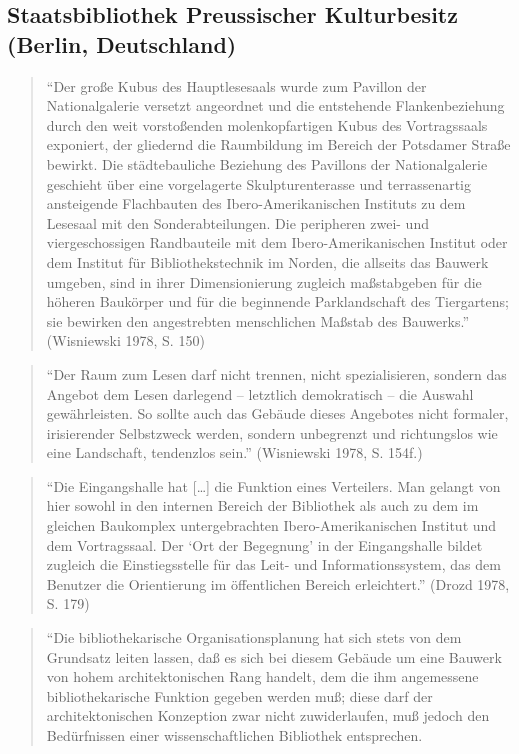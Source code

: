 \documentclass[a4paper,
fontsize=11pt,
oneside,
numbers=noperiodatend,
parskip=half-,
bibliography=totoc,
final
]{scrartcl}
\begin{document}
\subsection*{Staatsbibliothek Preussischer Kulturbesitz (Berlin,
Deutschland)}\label{staatsbibliothek-preussischer-kulturbesitz-berlin-deutschland}

\begin{quote}
\enquote{Der große Kubus des Hauptlesesaals wurde zum Pavillon der
Nationalgalerie versetzt angeordnet und die entstehende Flankenbeziehung
durch den weit vorstoßenden molenkopfartigen Kubus des Vortragssaals
exponiert, der gliedernd die Raumbildung im Bereich der Potsdamer Straße
bewirkt. Die städtebauliche Beziehung des Pavillons der Nationalgalerie
geschieht über eine vorgelagerte Skulpturenterasse und terrassenartig
ansteigende Flachbauten des Ibero-Amerikanischen Instituts zu dem
Lesesaal mit den Sonderabteilungen. Die peripheren zwei- und
viergeschossigen Randbauteile mit dem Ibero-Amerikanischen Institut oder
dem Institut für Bibliothekstechnik im Norden, die allseits das Bauwerk
umgeben, sind in ihrer Dimensionierung zugleich maßstabgeben für die
höheren Baukörper und für die beginnende Parklandschaft des Tiergartens;
sie bewirken den angestrebten menschlichen Maßstab des Bauwerks.}
(Wisniewski 1978, S. 150)
\end{quote}

\begin{quote}
\enquote{Der Raum zum Lesen darf nicht trennen, nicht spezialisieren,
sondern das Angebot dem Lesen darlegend -- letztlich demokratisch -- die
Auswahl gewährleisten. So sollte auch das Gebäude dieses Angebotes nicht
formaler, irisierender Selbstzweck werden, sondern unbegrenzt und
richtungslos wie eine Landschaft, tendenzlos sein.} (Wisniewski 1978, S.
154f.)
\end{quote}

\begin{quote}
\enquote{Die Eingangshalle hat {[}\ldots{}{]} die Funktion eines
Verteilers. Man gelangt von hier sowohl in den internen Bereich der
Bibliothek als auch zu dem im gleichen Baukomplex untergebrachten
Ibero-Amerikanischen Institut und dem Vortragssaal. Der \enquote{Ort der
Begegnung} in der Eingangshalle bildet zugleich die Einstiegsstelle für
das Leit- und Informationssystem, das dem Benutzer die Orientierung im
öffentlichen Bereich erleichtert.} (Drozd 1978, S. 179)
\end{quote}

\begin{quote}
``Die bibliothekarische Organisationsplanung hat sich stets von dem
Grundsatz leiten lassen, daß es sich bei diesem Gebäude um eine Bauwerk
von hohem architektonischen Rang handelt, dem die ihm angemessene
bibliothekarische Funktion gegeben werden muß; diese darf der
architektonischen Konzeption zwar nicht zuwiderlaufen, muß jedoch den
Bedürfnissen einer wissenschaftlichen Bibliothek entsprechen.
\end{quote}
\end{document}
